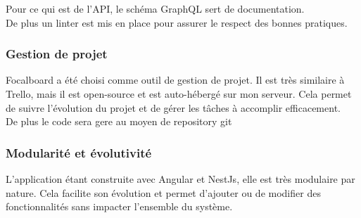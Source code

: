 Pour ce qui est de l'API, le schéma GraphQL sert de documentation.\\

De plus un linter est mis en place pour assurer le respect des bonnes pratiques.

\subsubsection{Gestion de projet}

Focalboard a été choisi comme outil de gestion de projet.
Il est très similaire à Trello, mais il est open-source et est auto-hébergé sur mon serveur.
Cela permet de suivre l'évolution du projet et de gérer les tâches à accomplir efficacement.\\

De plus le code sera gere au moyen de repository git

\subsubsection{Modularité et évolutivité}

L'application étant construite avec Angular et NestJs, elle est très modulaire par nature.
Cela facilite son évolution et permet d'ajouter ou de modifier des fonctionnalités sans impacter l'ensemble du système.


